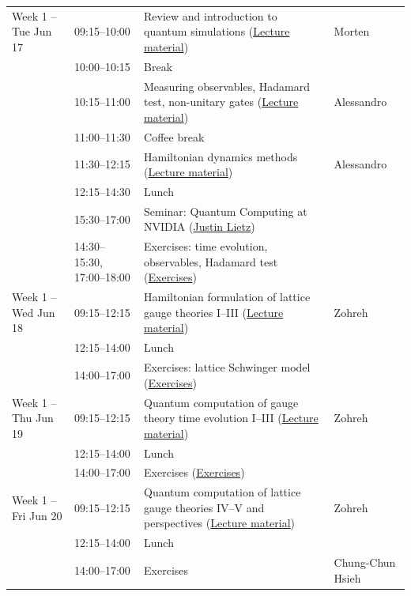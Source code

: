 \documentclass[prc,amsart,english]{revtex4-2}
\begin{document}
\begin{table}[hbtp]
{\begin{tabular}{l l l l}
Week 1 -- Tue Jun 17 & 09:15--10:00 & Review and introduction to quantum simulations (\href{https://github.com/NuclearTalent/TalentQuantumComputingECT2025/blob/main/doc/pub/TuesdayJune17/Firstlecture.ipynb}{Lecture material}) & Morten \\
& 10:00--10:15 & Break &  \\
& 10:15--11:00 & Measuring observables, Hadamard test, non-unitary gates (\href{https://github.com/NuclearTalent/TalentQuantumComputingECT2025/blob/main/doc/pub/TuesdayJune17/slides_tuesday_second_and_third.pdf}{Lecture material}) & Alessandro \\
& 11:00--11:30 & Coffee break &  \\
& 11:30--12:15 & Hamiltonian dynamics methods (\href{https://github.com/NuclearTalent/TalentQuantumComputingECT2025/blob/main/doc/pub/TuesdayJune17/slides_tuesday_second_and_third.pdf}{Lecture material}) & Alessandro \\
& 12:15--14:30 & Lunch &  \\
& 15:30--17:00 & Seminar: Quantum Computing at NVIDIA (\href{https://developer.nvidia.com/blog/author/jlietz/}{Justin Lietz}) &  \\
& 14:30--15:30, 17:00--18:00 & Exercises: time evolution, observables, Hadamard test (\href{https://github.com/NuclearTalent/TalentQuantumComputingECT2025/blob/main/doc/pub/Exercises}{Exercises}) &  \\

Week 1 -- Wed Jun 18 & 09:15--12:15 & Hamiltonian formulation of lattice gauge theories I--III (\href{https://drive.google.com/file/d/1cxXbFsvM0VmpCPmC0dEwOSxOk6ut2LMq/view}{Lecture material}) & Zohreh \\
& 12:15--14:00 & Lunch &  \\
& 14:00--17:00 & Exercises: lattice Schwinger model (\href{https://github.com/NuclearTalent/TalentQuantumComputingECT2025/blob/main/doc/pub/Exercises}{Exercises}) &  \\

Week 1 -- Thu Jun 19 & 09:15--12:15 & Quantum computation of gauge theory time evolution I--III (\href{https://drive.google.com/file/d/1pCn-q7zwCfVOBq-YJsgTK0Wx_1GWgzo0/view}{Lecture material}) & Zohreh \\
& 12:15--14:00 & Lunch &  \\
& 14:00--17:00 & Exercises (\href{https://github.com/NuclearTalent/TalentQuantumComputingECT2025/blob/main/doc/pub/Exercises}{Exercises}) &  \\

Week 1 -- Fri Jun 20 & 09:15--12:15 & Quantum computation of lattice gauge theories IV--V and perspectives (\href{https://drive.google.com/file/d/1pCn-q7zwCfVOBq-YJsgTK0Wx_1GWgzo0/view}{Lecture material}) & Zohreh \\
& 12:15--14:00 & Lunch &  \\
& 14:00--17:00 & Exercises & Chung-Chun Hsieh \\


\end{tabular}}
\end{table}
\end{document}
